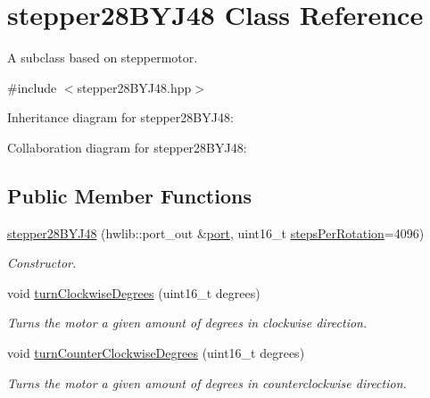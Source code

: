 \hypertarget{classstepper28BYJ48}{}\section{stepper28\+B\+Y\+J48 Class Reference}
\label{classstepper28BYJ48}


A subclass based on steppermotor.  




{\ttfamily \#include $<$stepper28\+B\+Y\+J48.\+hpp$>$}



Inheritance diagram for stepper28\+B\+Y\+J48\+:


Collaboration diagram for stepper28\+B\+Y\+J48\+:
\subsection*{Public Member Functions}
\begin{DoxyCompactItemize}
\item 
\hyperlink{classstepper28BYJ48_a0cd7320252c267c728f17ca3de814019}{stepper28\+B\+Y\+J48} (hwlib\+::port\+\_\+out \&\hyperlink{classsteppermotor_a46084d0eae151993b4da56d9de1136d9}{port}, uint16\+\_\+t \hyperlink{classstepper28BYJ48_a1e6ced57ccc8b4df2f706ed25179586a}{steps\+Per\+Rotation}=4096)
\begin{DoxyCompactList}\small\item\em Constructor. \end{DoxyCompactList}\item 
void \hyperlink{classstepper28BYJ48_af3033cdae6ad2f3670053759d13f809f}{turn\+Clockwise\+Degrees} (uint16\+\_\+t degrees)
\begin{DoxyCompactList}\small\item\em Turns the motor a given amount of degrees in clockwise direction. \end{DoxyCompactList}\item 
void \hyperlink{classstepper28BYJ48_a074bc8527a623e0894f2ef8674d83bf0}{turn\+Counter\+Clockwise\+Degrees} (uint16\+\_\+t degrees)
\begin{DoxyCompactList}\small\item\em Turns the motor a given amount of degrees in counterclockwise direction. \end{DoxyCompactList}\end{DoxyCompactItemize}
